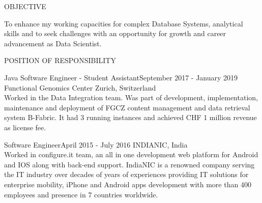 \documentclass{resume} %
\begin{document}

\begin{rSection}{OBJECTIVE}

{To enhance my working capacities for complex Database Systems, analytical skills and to seek
challenges with an opportunity for growth and career advancement as Data Scientist.}


\end{rSection}


\begin{rSection}{POSITION OF RESPONSIBILITY}

\begin{rSubsection}{Java Software Engineer - Student Assistant}{September 2017 - January 2019} 
{Functional Genomics Center Zurich, Switzerland} 
{\\Worked in the Data Integration team. Was part of development, implementation, maintenance and deployment of FGCZ content management and data retrieval system B-Fabric. It had 3 running instances and achieved CHF 1 million revenue as license fee.}
\end{rSubsection}

\begin{rSubsection}{Software Engineer}{April 2015 - July 2016} 
{INDIANIC, India} 
{\\Worked in configure.it team, an all in one development web platform for Android and IOS along with back-end support. IndiaNIC is a renowned company serving the IT industry over decades of years of experiences providing IT solutions for enterprise mobility, iPhone and Android apps development with more than 400 employees and presence in 7 countries worldwide.} 
\end{rSubsection}
\end{rSection}

\end{document}
